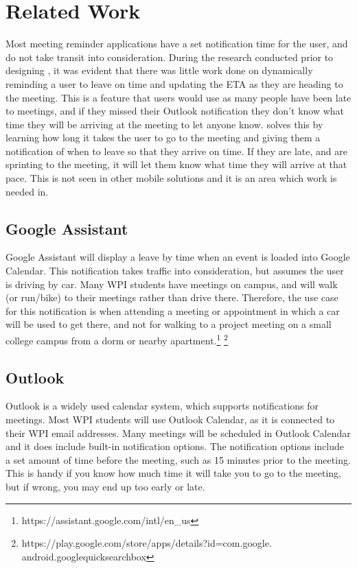 \section{Related Work}
Most meeting reminder applications have a set notification time for the user, and do not take transit into consideration. During the research conducted prior to designing , it was evident that there was little work done on dynamically reminding a user to leave on time and updating the ETA as they are heading to the meeting. This is a feature that users would use as many people have been late to meetings, and if they missed their Outlook notification they don't know what time they will be arriving at the meeting to let anyone know.  solves this by learning how long it takes the user to go to the meeting and giving them a notification of when to leave so that they arrive on time. If they are late, and are sprinting to the meeting, it will let them know what time they will arrive at that pace. This is not seen in other mobile solutions and it is an area which work is needed in.
\subsection{Google Assistant}
Google Assistant will display a leave by time when an event is loaded into Google Calendar. This notification takes traffic into consideration, but assumes the user is driving by car. Many WPI students have meetings on campus, and will walk (or run/bike) to their meetings rather than drive there. Therefore, the use case for this notification is when attending a meeting or appointment in which a car will be used to get there, and not for walking to a project meeting on a small college campus from a dorm or nearby apartment.\footnote{https://assistant.google.com/intl/en\_us} \footnote{https://play.google.com/store/apps/details?id=com.google.\\android.googlequicksearchbox}

\subsection{Outlook} Outlook is a widely used calendar system, which supports notifications for meetings. Most WPI students will use Outlook Calendar, as it is connected to their WPI email addresses. Many meetings will be scheduled in Outlook Calendar and it does include built-in notification options. The notification options include a set amount of time before the meeting, such as 15 minutes prior to the meeting. This is handy if you know how much time it will take you to go to the meeting, but if wrong, you may end up too early or late. 
